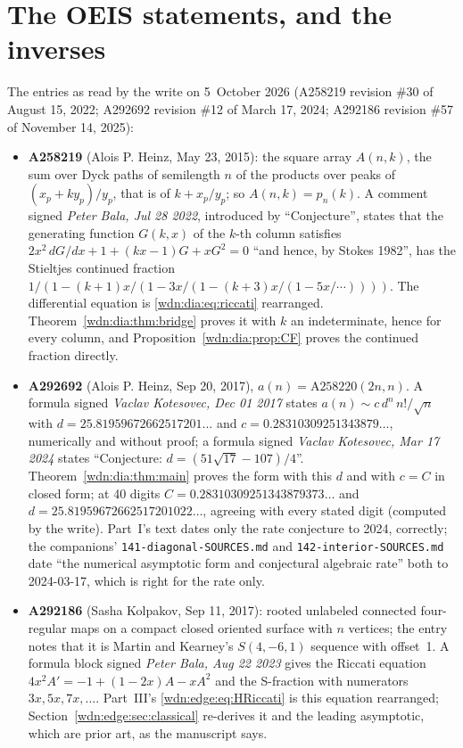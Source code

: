 \documentclass[11pt,letterpaper]{article}
\theoremstyle{remark}\newtheorem{remark}[theorem]{Remark}
\newcommand{\file}[1]{\nolinkurl{#1}}
\begin{document}
\section*{The OEIS statements, and the inverses}\label{wdn:sec:oeis}
The entries as read by the write on 5~October 2026 (A258219 revision \#30 of August 15, 2022; A292692 revision \#12 of March 17, 2024; A292186 revision \#57 of November 14, 2025):
\begin{itemize}
\item \textbf{A258219} (Alois P. Heinz, May 23, 2015): the square array $A(n,k)$, the sum over Dyck paths of semilength $n$ of the products over peaks of $(x_p+ky_p)/y_p$, that is of $k+x_p/y_p$; so $A(n,k)=p_n(k)$. A comment signed \emph{Peter Bala, Jul 28 2022}, introduced by ``Conjecture'', states that the generating function $G(k,x)$ of the $k$-th column satisfies $2x^2\,dG/dx+1+(kx-1)G+xG^2=0$ ``and hence, by Stokes 1982'', has the Stieltjes continued fraction $1/(1-(k+1)x/(1-3x/(1-(k+3)x/(1-5x/\cdots))))$. The differential equation is \eqref{wdn:dia:eq:riccati} rearranged. Theorem~\ref{wdn:dia:thm:bridge} proves it with $k$ an indeterminate, hence for every column, and Proposition~\ref{wdn:dia:prop:CF} proves the continued fraction directly.
\item \textbf{A292692} (Alois P. Heinz, Sep 20, 2017), $a(n)=\mathrm{A258220}(2n,n)$. A formula signed \emph{Vaclav Kotesovec, Dec 01 2017} states $a(n)\sim c\,d^n\,n!/\sqrt n$ with $d=25.81959672662517201\ldots$ and $c=0.28310309251343879\ldots$, numerically and without proof; a formula signed \emph{Vaclav Kotesovec, Mar 17 2024} states ``Conjecture: $d=(51\sqrt{17}-107)/4$''. Theorem~\ref{wdn:dia:thm:main} proves the form with this $d$ and with $c=C$ in closed form; at 40 digits $C=0.28310309251343879373\ldots$ and $d=25.81959672662517201022\ldots$, agreeing with every stated digit (computed by the write). Part~I's text dates only the rate conjecture to 2024, correctly; the companions' \file{141-diagonal-SOURCES.md} and \file{142-interior-SOURCES.md} date ``the numerical asymptotic form and conjectural algebraic rate'' both to 2024-03-17, which is right for the rate only.
\item \textbf{A292186} (Sasha Kolpakov, Sep 11, 2017): rooted unlabeled connected four-regular maps on a compact closed oriented surface with $n$ vertices; the entry notes that it is Martin and Kearney's $S(4,-6,1)$ sequence with offset~1. A formula block signed \emph{Peter Bala, Aug 22 2023} gives the Riccati equation $4x^2A'=-1+(1-2x)A-xA^2$ and the S-fraction with numerators $3x,5x,7x,\ldots$. Part~III's \eqref{wdn:edge:eq:HRiccati} is this equation rearranged; Section~\ref{wdn:edge:sec:classical} re-derives it and the leading asymptotic, which are prior art, as the manuscript says.
\end{itemize}
\end{document}
